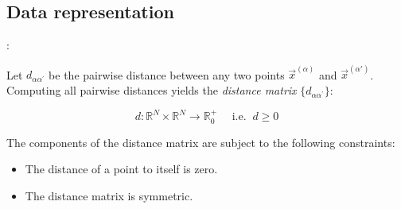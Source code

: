 \subsection{Data representation}

\begin{frame}{\secname:~\subsecname}


Let $d_{\alpha \alpha^{'}}$ be the pairwise distance between any two points $\vec x^{(\alpha)}$ and $\vec x^{(\alpha')}$. Computing all pairwise distances yields the \emph{distance matrix} $\big\{ d_{\alpha \alpha^{'}} \big\}$:

\begin{equation}
\label{eq:pairwisedistdef}
d: \mathbb{R}^N \times \mathbb{R}^N 
    \rightarrow \mathbb{R}_0^+ \quad\text{ i.e.}\;\; d \ge 0
\end{equation}

The components of the distance matrix are subject to the following constraints:
\begin{itemize}
\item The distance of a point to itself is zero.
\item The distance matrix is symmetric.
\end{itemize}

\end{frame}
